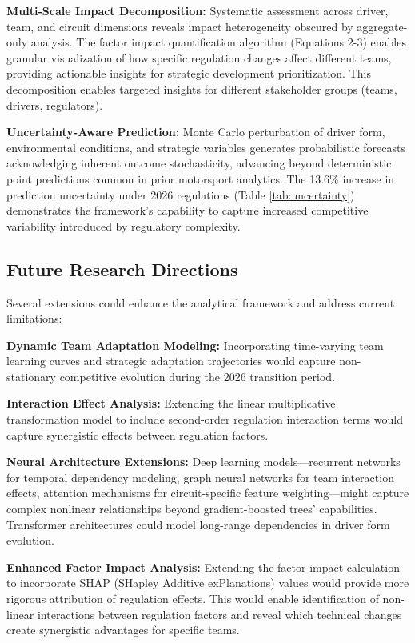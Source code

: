\documentclass[conference]{IEEEtran}
\begin{document}
\textbf{Multi-Scale Impact Decomposition:} Systematic assessment across driver, team, and circuit dimensions reveals impact heterogeneity obscured by aggregate-only analysis. The factor impact quantification algorithm (Equations 2-3) enables granular visualization of how specific regulation changes affect different teams, providing actionable insights for strategic development prioritization. This decomposition enables targeted insights for different stakeholder groups (teams, drivers, regulators).

\textbf{Uncertainty-Aware Prediction:} Monte Carlo perturbation of driver form, environmental conditions, and strategic variables generates probabilistic forecasts acknowledging inherent outcome stochasticity, advancing beyond deterministic point predictions common in prior motorsport analytics. The 13.6\% increase in prediction uncertainty under 2026 regulations (Table \ref{tab:uncertainty}) demonstrates the framework's capability to capture increased competitive variability introduced by regulatory complexity.

\subsection{Future Research Directions}

Several extensions could enhance the analytical framework and address current limitations:

\textbf{Dynamic Team Adaptation Modeling:} Incorporating time-varying team learning curves and strategic adaptation trajectories would capture non-stationary competitive evolution during the 2026 transition period.

\textbf{Interaction Effect Analysis:} Extending the linear multiplicative transformation model to include second-order regulation interaction terms would capture synergistic effects between regulation factors.

\textbf{Neural Architecture Extensions:} Deep learning models—recurrent networks for temporal dependency modeling, graph neural networks for team interaction effects, attention mechanisms for circuit-specific feature weighting—might capture complex nonlinear relationships beyond gradient-boosted trees' capabilities. Transformer architectures could model long-range dependencies in driver form evolution.

\textbf{Enhanced Factor Impact Analysis:} Extending the factor impact calculation to incorporate SHAP (SHapley Additive exPlanations) values would provide more rigorous attribution of regulation effects. This would enable identification of non-linear interactions between regulation factors and reveal which technical changes create synergistic advantages for specific teams.
\end{document}
